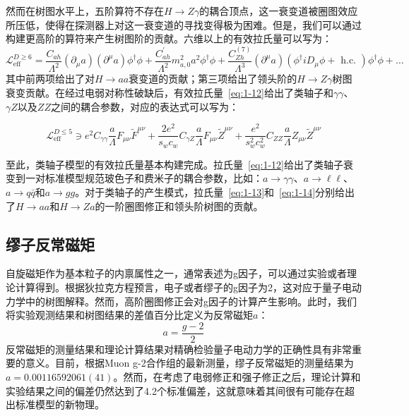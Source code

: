 然而在树图水平上，五阶算符不存在$H\rightarrow Z\gamma$的耦合顶点，这一衰变道被圈图效应所压低，使得在探测器上对这一衰变道的寻找变得极为困难。但是，我们可以通过构建更高阶的算符来产生树图阶的贡献。六维以上的有效拉氏量可以写为：
\begin{equation}\label{eq:1-13}
    \mathcal{L}_{\mathrm{eff}}^{D \geq 6}=\frac{C_{a h}}{\Lambda^{2}}(\partial_{\mu} a)\left(\partial^{\mu} a\right) \phi^{\dagger} \phi+\frac{C_{a h}^{\prime}}{\Lambda^{2}} m_{a, 0}^{2} a^{2} \phi^{\dagger} \phi+\frac{C_{Z h}^{(7)}}{\Lambda^{3}}\left(\partial^{\mu} a\right)\left(\phi^{\dagger} i D_{\mu} \phi+\text { h.c. }\right) \phi^{\dagger} \phi+\ldots 
\end{equation}
其中前两项给出了对$H\rightarrow aa$衰变道的贡献；第三项给出了领头阶的$H\rightarrow Z\gamma$树图衰变贡献。在经过电弱对称性破缺后，有效拉氏量~\eqref{eq:1-12}给出了类轴子和$\gamma\gamma$、$\gamma Z$以及$ZZ$之间的耦合参数，对应的表达式可以写为：

\begin{equation}\label{eq:1-14}
    \mathcal{L}_{\text {eff }}^{D \leq 5} \ni e^{2} C_{\gamma \gamma} \frac{a}{\Lambda} F_{\mu \nu} \tilde{F}^{\mu \nu}+\frac{2 e^{2}}{s_{w} c_{w}} C_{\gamma Z} \frac{a}{\Lambda} F_{\mu \nu} \tilde{Z}^{\mu \nu}+\frac{e^{2}}{s_{w}^{2} c_{w}^{2}} C_{Z Z} \frac{a}{\Lambda} Z_{\mu \nu} \tilde{Z}^{\mu \nu}
\end{equation}

至此，类轴子模型的有效拉氏量基本构建完成。拉氏量~\eqref{eq:1-12}给出了类轴子衰变到一对标准模型规范玻色子和费米子的耦合参数，比如：$a\rightarrow \gamma\gamma$、$a\rightarrow \ell\ell$、$a\rightarrow q\bar{q}$和$a\rightarrow gg$。对于类轴子的产生模式，拉氏量~\eqref{eq:1-13}和~\eqref{eq:1-14}分别给出了$H\rightarrow aa$和$H\rightarrow Za$的一阶圈图修正和领头阶树图的贡献。

\subsection{缪子反常磁矩}

自旋磁矩作为基本粒子的内禀属性之一，通常表述为g因子，可以通过实验或者理论计算得到。根据狄拉克方程预言，电子或者缪子的g因子为2，这对应于量子电动力学中的树图解释。然而，高阶圈图修正会对g因子的计算产生影响。此时，我们将实验观测结果和树图结果的差值百分比定义为反常磁矩$a$：
\begin{equation}\label{eq:1-15}
    a = \frac{g-2}{2}
\end{equation}
反常磁矩的测量结果和理论计算结果对精确检验量子电动力学的正确性具有非常重要的意义。目前，根据Muon g-2合作组的最新测量，缪子反常磁矩的测量结果为$a=0.00116592061(41)$\cite{abi2021measurement}。然而，在考虑了电弱修正和强子修正之后，理论计算和实验结果之间的偏差仍然达到了4.2个标准偏差，这就意味着其间很有可能存在超出标准模型的新物理。

